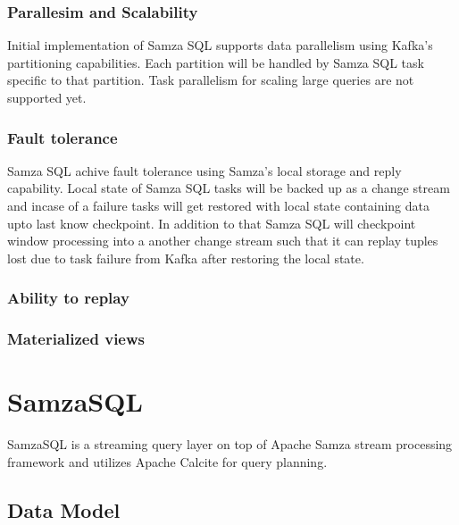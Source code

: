 \documentclass[10pt, conference, compsocconf]{IEEEtran}
\begin{document}
\subsubsection{Parallesim and Scalability}

Initial implementation of Samza SQL supports data parallelism using Kafka's partitioning capabilities. Each partition will be handled by Samza SQL task specific to that partition. Task parallelism for scaling large queries are not supported yet.

\subsubsection{Fault tolerance}

Samza SQL achive fault tolerance using Samza's local storage and reply capability. Local state of Samza SQL tasks will be backed up as a change stream and incase of a failure tasks will get restored with local state containing data upto last know checkpoint. In addition to that Samza SQL will checkpoint window processing into a another change stream such that it can replay tuples lost due to task failure from Kafka after restoring the local state.

\subsubsection{Ability to replay}


\subsubsection{Materialized views}



\section{SamzaSQL}
SamzaSQL is a streaming query layer on top of Apache Samza stream processing framework and utilizes Apache Calcite \cite{asf:2014:calcite} for query planning. 

\subsection{Data Model}
\end{document}
